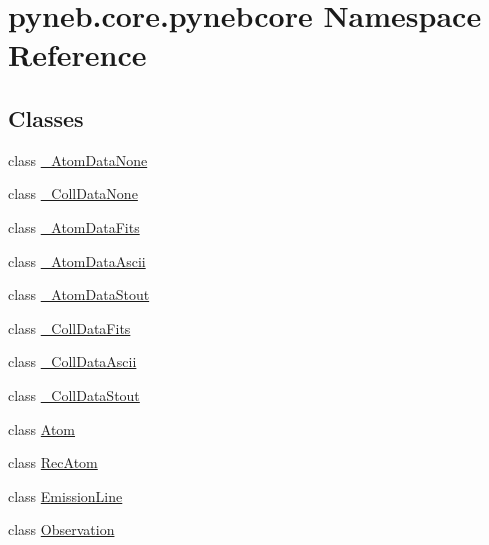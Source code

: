 \hypertarget{namespacepyneb_1_1core_1_1pynebcore}{\section{pyneb.\-core.\-pynebcore Namespace Reference}
\label{namespacepyneb_1_1core_1_1pynebcore}
}
\subsection*{Classes}
\begin{DoxyCompactItemize}
\item 
class \hyperlink{classpyneb_1_1core_1_1pynebcore_1_1___atom_data_none}{\-\_\-\-Atom\-Data\-None}
\item 
class \hyperlink{classpyneb_1_1core_1_1pynebcore_1_1___coll_data_none}{\-\_\-\-Coll\-Data\-None}
\item 
class \hyperlink{classpyneb_1_1core_1_1pynebcore_1_1___atom_data_fits}{\-\_\-\-Atom\-Data\-Fits}
\item 
class \hyperlink{classpyneb_1_1core_1_1pynebcore_1_1___atom_data_ascii}{\-\_\-\-Atom\-Data\-Ascii}
\item 
class \hyperlink{classpyneb_1_1core_1_1pynebcore_1_1___atom_data_stout}{\-\_\-\-Atom\-Data\-Stout}
\item 
class \hyperlink{classpyneb_1_1core_1_1pynebcore_1_1___coll_data_fits}{\-\_\-\-Coll\-Data\-Fits}
\item 
class \hyperlink{classpyneb_1_1core_1_1pynebcore_1_1___coll_data_ascii}{\-\_\-\-Coll\-Data\-Ascii}
\item 
class \hyperlink{classpyneb_1_1core_1_1pynebcore_1_1___coll_data_stout}{\-\_\-\-Coll\-Data\-Stout}
\item 
class \hyperlink{classpyneb_1_1core_1_1pynebcore_1_1_atom}{Atom}
\item 
class \hyperlink{classpyneb_1_1core_1_1pynebcore_1_1_rec_atom}{Rec\-Atom}
\item 
class \hyperlink{classpyneb_1_1core_1_1pynebcore_1_1_emission_line}{Emission\-Line}
\item 
class \hyperlink{classpyneb_1_1core_1_1pynebcore_1_1_observation}{Observation}
\end{DoxyCompactItemize}
